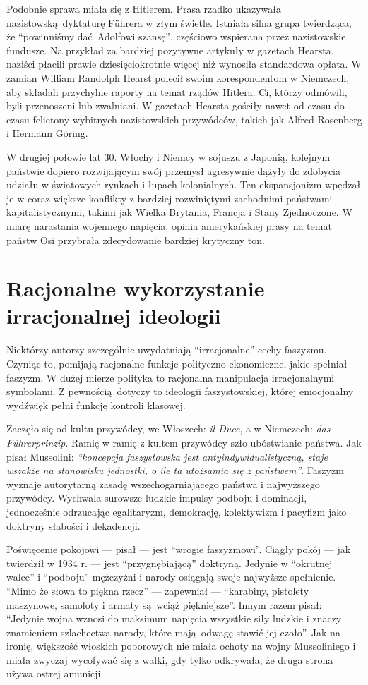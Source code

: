 \documentclass[12pt]{book}
\newcommand{\sekcja}[1]{
  \addcontentsline{toc}{section}{#1}
  \section*{#1}
}
\begin{document}
Podobnie sprawa miała się z Hitlerem. Prasa rzadko ukazywała nazistowską dyktaturę Führera w złym świetle. Istniała silna grupa twierdząca, że ``powinniśmy dać Adolfowi szansę'', częściowo wspierana przez nazistowskie fundusze. Na przykład za bardziej pozytywne artykuły w gazetach Hearsta, naziści płacili prawie dziesięciokrotnie więcej niż wynosiła standardowa opłata. W zamian William Randolph Hearst polecił swoim korespondentom w Niemczech, aby składali przychylne raporty na temat rządów Hitlera. Ci, którzy odmówili, byli przenoszeni lub zwalniani. W gazetach Hearsta gościły nawet od czasu do czasu felietony wybitnych nazistowskich przywódców, takich jak Alfred Rosenberg i Hermann Göring.

W drugiej połowie lat 30. Włochy i Niemcy w sojuszu z Japonią, kolejnym państwie dopiero rozwijającym swój przemysł agresywnie dążyły do zdobycia udziału w światowych rynkach i łupach kolonialnych. Ten ekspansjonizm wpędzał je w coraz większe konflikty z bardziej rozwiniętymi zachodnimi państwami kapitalistycznymi, takimi jak Wielka Brytania, Francja i Stany Zjednoczone. W miarę narastania wojennego napięcia, opinia amerykańskiej prasy na temat państw Osi przybrała zdecydowanie bardziej krytyczny ton.

\sekcja{Racjonalne wykorzystanie irracjonalnej ideologii}
Niektórzy autorzy szczególnie uwydatniają ``irracjonalne'' cechy faszyzmu. Czyniąc to, pomijają racjonalne funkcje polityczno-ekonomiczne, jakie spełniał faszyzm. W dużej mierze polityka to racjonalna manipulacja irracjonalnymi symbolami. Z pewnością dotyczy to ideologii faszystowskiej, której emocjonalny wydźwięk pełni funkcję kontroli klasowej.

Zaczęło się od kultu przywódcy, we Włoszech: \textit{il Duce}, a w Niemczech: \textit{das Führerprinzip}. Ramię w ramię z kultem przywódcy szło ubóstwianie państwa. Jak pisał Mussolini: \textit{``koncepcja faszystowska jest antyindywidualistyczną, staje wszakże na stanowisku jednostki, o ile ta utożsamia się z państwem''}. Faszyzm wyznaje autorytarną zasadę wszechogarniającego państwa i najwyższego przywódcy. Wychwala surowsze ludzkie impulsy podboju i dominacji, jednocześnie odrzucając egalitaryzm, demokrację, kolektywizm i pacyfizm jako doktryny słabości i dekadencji.

Poświęcenie pokojowi — pisał — jest ``wrogie faszyzmowi''. Ciągły pokój — jak twierdził w 1934 r. — jest ``przygnębiającą'' doktryną. Jedynie w ``okrutnej walce'' i ``podboju'' mężczyźni i narody osiągają swoje najwyższe spełnienie. ``Mimo że słowa to piękna rzecz'' — zapewniał — ``karabiny, pistolety maszynowe, samoloty i armaty są wciąż piękniejsze''. Innym razem pisał: ``Jedynie wojna wznosi do maksimum napięcia wszystkie siły ludzkie i znaczy znamieniem szlachectwa narody, które mają odwagę stawić jej czoło''. Jak na ironię, większość włoskich poborowych nie miała ochoty na wojny Mussoliniego i miała zwyczaj wycofywać się z walki, gdy tylko odkrywała, że druga strona używa ostrej amunicji.
\end{document}

